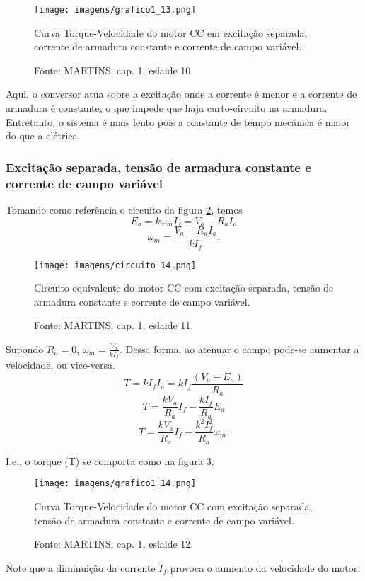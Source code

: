 \begin{figure}[ht!]
\center
\texttt{[image: imagens/grafico1\_13.png]}
\caption{\label{fig:G1_13}Curva Torque-Velocidade do motor CC em excitação separada, corrente de armadura constante e corrente de campo variável.}
\caption*{Fonte: MARTINS, cap. 1, eslaide 10.}
\end{figure}

Aqui, o conversor atua sobre a excitação onde a corrente é menor e a corrente de armadura é constante, o que impede que haja curto-circuito na armadura. Entretanto, o sistema é mais lento pois a constante de tempo mecânica é maior do que a elétrica.

\subsubsection{Excitação separada, tensão de armadura constante e corrente de campo variável}

Tomando como referência o circuito da figura \ref{fig:C14}, temos
\[E_{a} = k\omega_{m}I_{f} = V_{a} - R_{a}I_{a}\]
\[\omega_{m} = \frac{V_{a} - R_{a}I_{a}}{kI_{f}}.\]

\begin{figure}[ht!]
\center
\texttt{[image: imagens/circuito\_14.png]}
\caption{\label{fig:C14} Circuito equivalente do motor CC com excitação separada, tensão de armadura constante e corrente de campo variável.}
\caption*{Fonte: MARTINS, cap. 1, eslaide 11.}
\end{figure}

Supondo $R_{a} = 0$, $\omega_{m} = \frac{V_{a}}{kI_{f}} $. Dessa forma, ao atenuar o campo pode-se aumentar a velocidade, ou vice-versa.
\[T = kI_{f}I_{a} = kI_{f} \frac{(V_{a} - E_{a})}{R_{a}}\]
\[T = \frac{kV_{a}}{R_{a}}I_{f} - \frac{kI_{f}}{R_{a}}E_{a}\]
\[T = \frac{kV_{a}}{R_{a}}I_{f} - \frac{k^{2}I_{f}^{2}}{R_{a}}\omega_{m}.\]

I.e., o torque (T) se comporta como na figura \ref{fig:G1_14}.

\begin{figure}[ht!]
\center
\texttt{[image: imagens/grafico1\_14.png]}
\caption{\label{fig:G1_14} Curva Torque-Velocidade do motor CC com excitação separada, tensão de armadura constante e corrente de campo variável.}
\caption*{Fonte: MARTINS, cap. 1, eslaide 12.}
\end{figure}

Note que a diminuição da corrente $I_{f}$ provoca o aumento da velocidade do motor. 

